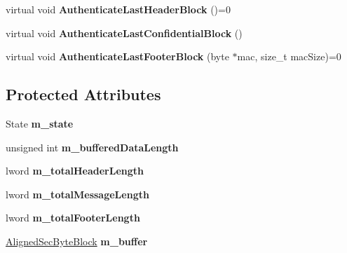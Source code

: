 \begin{DoxyCompactItemize}
\item 
\hypertarget{class_authenticated_symmetric_cipher_base_ad1d260dadb43b2d8e81a2e80c0c33ecf}{
virtual void {\bfseries AuthenticateLastHeaderBlock} ()=0}
\label{class_authenticated_symmetric_cipher_base_ad1d260dadb43b2d8e81a2e80c0c33ecf}

\item 
\hypertarget{class_authenticated_symmetric_cipher_base_acb04325e1d28d273cd9eba98de8d260e}{
virtual void {\bfseries AuthenticateLastConfidentialBlock} ()}
\label{class_authenticated_symmetric_cipher_base_acb04325e1d28d273cd9eba98de8d260e}

\item 
\hypertarget{class_authenticated_symmetric_cipher_base_ae021ab715433a9f98c37be8885cb0448}{
virtual void {\bfseries AuthenticateLastFooterBlock} (byte $\ast$mac, size\_\-t macSize)=0}
\label{class_authenticated_symmetric_cipher_base_ae021ab715433a9f98c37be8885cb0448}

\end{DoxyCompactItemize}
\subsection*{Protected Attributes}
\begin{DoxyCompactItemize}
\item 
\hypertarget{class_authenticated_symmetric_cipher_base_a606b28da202156468ceb7cf69aeaeb0e}{
State {\bfseries m\_\-state}}
\label{class_authenticated_symmetric_cipher_base_a606b28da202156468ceb7cf69aeaeb0e}

\item 
\hypertarget{class_authenticated_symmetric_cipher_base_a4b47b01d9ccc90fba2c4743e419716b4}{
unsigned int {\bfseries m\_\-bufferedDataLength}}
\label{class_authenticated_symmetric_cipher_base_a4b47b01d9ccc90fba2c4743e419716b4}

\item 
\hypertarget{class_authenticated_symmetric_cipher_base_aea7cb3964eecf4f5a610d2174257e8f4}{
lword {\bfseries m\_\-totalHeaderLength}}
\label{class_authenticated_symmetric_cipher_base_aea7cb3964eecf4f5a610d2174257e8f4}

\item 
\hypertarget{class_authenticated_symmetric_cipher_base_a1105b4cf3ee159a6a4517e1135c9f491}{
lword {\bfseries m\_\-totalMessageLength}}
\label{class_authenticated_symmetric_cipher_base_a1105b4cf3ee159a6a4517e1135c9f491}

\item 
\hypertarget{class_authenticated_symmetric_cipher_base_af593199ba96b2c17d1b29f41fc384c7d}{
lword {\bfseries m\_\-totalFooterLength}}
\label{class_authenticated_symmetric_cipher_base_af593199ba96b2c17d1b29f41fc384c7d}

\item 
\hypertarget{class_authenticated_symmetric_cipher_base_a8ee68583bb1d9bad94baca657ea15b05}{
\hyperlink{class_sec_block}{AlignedSecByteBlock} {\bfseries m\_\-buffer}}
\label{class_authenticated_symmetric_cipher_base_a8ee68583bb1d9bad94baca657ea15b05}

\end{DoxyCompactItemize}



